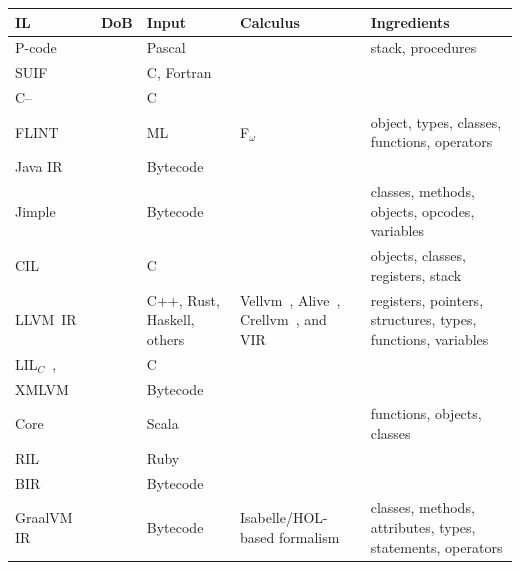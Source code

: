 
\begin{tabularx}{\linewidth}{ll>{\raggedright}p{.1\linewidth}>{\raggedright}p{.3\linewidth}>{\raggedright\arraybackslash}X}
\toprule
IL
  & DoB
  & Input
  & Calculus
  & Ingredients
  \\
\midrule
P-code~\citep{nelson1979comparison}
  & \citeyear{nelson1979comparison} %
  & Pascal
  &
  & stack, procedures
  \\
SUIF~\citep{wilson1994suif}
  & \citeyear{wilson1994suif} %
  & C, Fortran
  &
  &
  \\
C--~\citep{jones1997c}
  & \citeyear{jones1997c} %
  & C
  &
  &
  \\
FLINT~\citep{shao1997typed}
  & \citeyear{shao1997typed} %
  & ML
  & {\sffamily F\(_\omega\)}~\citep{reynolds1974towards}
  & object, types, classes, functions, operators
  \\
Java IR~\citep{cierniak1996briki}
  & \citeyear{cierniak1996briki} %
  & Bytecode
  &
  &
  \\
Jimple~\citep{vallee1999soot}
  & \citeyear{vallee1999soot} %
  & Bytecode
  &
  & classes, methods, objects, opcodes, variables
  \\
CIL~\citep{necula2002cil}
  & \citeyear{necula2002cil} %
  & C
  &
  & objects, classes, registers, stack
  \\
LLVM~IR~\citep{lattner2004llvm}
  & \citeyear{lattner2004llvm} %
  & C++, Rust, Haskell, others
  & Vellvm~\citep{zhao2012formalizing}, Alive~\citep{lopes2015provably}, Crellvm~\citep{kang2018crellvm}, and VIR~\citep{zakowski2021modular}
  & registers, pointers, structures, types, functions, variables
  \\
LIL\(_C\)~\citep{chen2005simple},
  & \citeyear{chen2005simple} %
  & C
  &
  &
  \\
XMLVM~\citep{puder2005xml}
  & \citeyear{puder2005xml} %
  & Bytecode
  &
  &
  \\
Core~\citep{altherr2006typed}
  & \citeyear{altherr2006typed} %
  & Scala
  &
  & functions, objects, classes
  \\
RIL~\citep{furr2009ruby}
  & \citeyear{furr2009ruby} %
  & Ruby
  &
  &
  \\
BIR~\citep{demange2010provably}
  & \citeyear{demange2010provably} %
  & Bytecode
  &
  &
  \\
GraalVM IR~\citep{duboscq2013intermediate}
  & \citeyear{duboscq2013intermediate} %
  & Bytecode
  & Isabelle/HOL-based formalism~\citep{webb2023verifying}
  & classes, methods, attributes, types, statements, operators
  \\
\bottomrule
\end{tabularx}
